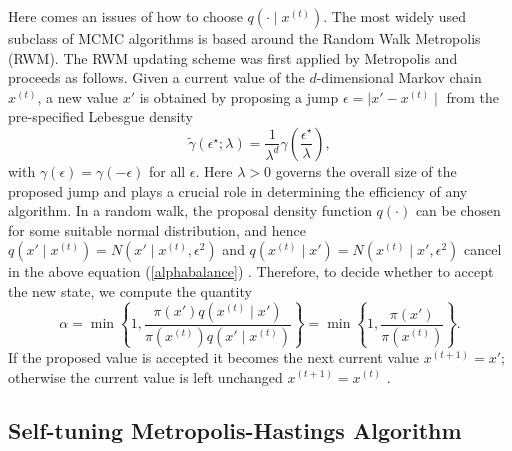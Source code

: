 Here comes an issues of how to choose $q(\cdot\mid x^{(t)})$. The most widely used subclass of MCMC algorithms is based around the Random Walk Metropolis (RWM). The RWM updating scheme was first applied by Metropolis \cite{metropolis1953equation} and proceeds as follows. Given a current value of the $d$-dimensional Markov chain $x^{(t)}$, a new value $x'$ is obtained by proposing a jump $\epsilon = \mid  x' - x^{(t)}\mid  $ from the pre-specified Lebesgue density 
\begin{equation}\label{stepsizeep}
\tilde{\gamma}(\epsilon^\star;\lambda) = \frac{1}{\lambda^d}\gamma \left( \frac{\epsilon^\star}{\lambda} \right),
\end{equation}
with $\gamma(\epsilon) = \gamma(-\epsilon)$ for all $\epsilon$. Here $\lambda>0$ governs the overall size of the proposed jump and plays a crucial role in determining the efficiency of any algorithm. In a random walk, the proposal density function $q(\cdot)$ can be chosen for some suitable normal distribution, and hence $q(x'\mid x^{(t)})=N(x'\mid x^{(t)},\epsilon^2)$ and $q(x^{(t)}\mid x')=N(x^{(t)}\mid x',\epsilon^2)$ cancel in the above equation (\ref{alphabalance}) \cite{sherlock2016adaptive}. Therefore, to decide whether to accept the new state, we compute the quantity
\begin{equation}
\alpha=\min \left\lbrace 1,\frac{\pi(x') q( x^{(t)}\mid x') }{\pi(x^{(t)})  q( x'\mid x^{(t)} ) }  \right\rbrace= \min \left\lbrace 1,\frac{\pi(x')  }{\pi(x^{(t)}) }  \right\rbrace.
\end{equation}
If the proposed value is accepted it becomes the next current value $x^{(t+1)}= x'$; otherwise the current value is left unchanged $x^{(t+1)} = x^{(t)}$ \cite{sherlock2010random}. 


\subsection{Self-tuning Metropolis-Hastings Algorithm}


